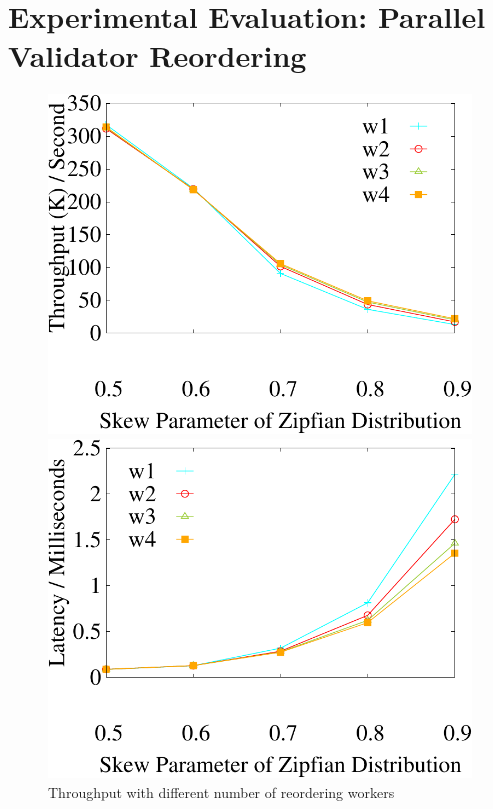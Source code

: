 \section{Experimental Evaluation: Parallel Validator Reordering}
\label{sec:experiments:parallel}

\begin{figure}[t]
	\centering
	\begin{minipage}[b]{0.31\linewidth}
		\centering
		\includegraphics[width=\textwidth]{./exp_fig/reorder/tps}
		\caption{Throughput with different number of reordering workers}
		\label{fig:reorder:tps}
	\end{minipage}    
	\begin{minipage}[b]{0.31\linewidth}
		\centering
		\includegraphics[width=\textwidth]{./exp_fig/reorder/latency}

\end{minipage}
\end{figure}
